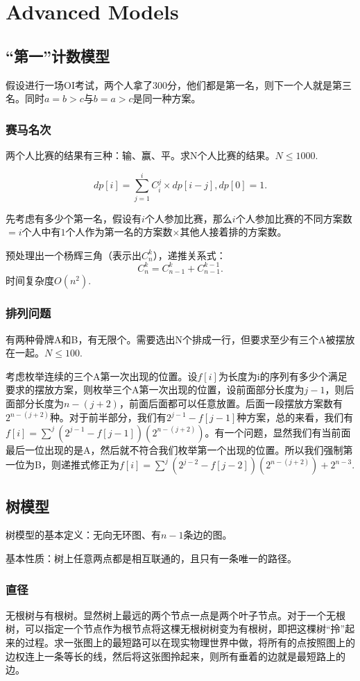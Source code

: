 \section{Advanced Models}
\subsection{“第一”计数模型}
假设进行一场OI考试，两个人拿了300分，他们都是第一名，则下一个人就是第三名。同时$a=b>c$与$b=a>c$是同一种方案。
\subsubsection{赛马名次}
两个人比赛的结果有三种：输、赢、平。求N个人比赛的结果。$N\le 1000.$

\begin{equation*}
    dp[i]=\sum_{j=1}^i C_i^j\times dp[i-j],dp[0]=1.
\end{equation*}

先考虑有多少个第一名，假设有$i$个人参加比赛，那么$i$个人参加比赛的不同方案数$=i$个人中有$1$个人作为第一名的方案数$\times$其他人接着排的方案数。

预处理出一个杨辉三角（表示出$C_n^k$），递推关系式：
\begin{equation*}
    C_n^k=C_{n-1}^k+C_{n-1}^{k-1}.
\end{equation*}
时间复杂度$O(n^2)$.
\subsubsection{排列问题}
有两种骨牌A和B，有无限个。需要选出N个排成一行，但要求至少有三个A被摆放在一起。$N\le 100.$

考虑枚举连续的三个A第一次出现的位置。设$f[i]$为长度为i的序列有多少个满足要求的摆放方案，则枚举三个A第一次出现的位置，设前面部分长度为$j-1$，则后面部分长度为$n-(j+2)$，前面后面都可以任意放置。后面一段摆放方案数有$2^{n-(j+2)}$种。对于前半部分，我们有$2^{j-1}-f[j-1]$种方案，总的来看，我们有$f[i]=\sum^j(2^{j-1}-f[j-1])(2^{n-(j+2)})$。有一个问题，显然我们有当前面最后一位出现的是A，然后就不符合我们枚举第一个出现的位置。所以我们强制第一位为B，则递推式修正为$f[i]=\sum^j(2^{j-2}-f[j-2])(2^{n-(j+2)})+2^{n-3}$.
\subsection{树模型}
树模型的基本定义：无向无环图、有$n-1$条边的图。

基本性质：树上任意两点都是相互联通的，且只有一条唯一的路径。
\subsubsection{直径}
无根树与有根树。显然树上最远的两个节点一点是两个叶子节点。对于一个无根树，可以指定一个节点作为根节点将这棵无根树树变为有根树，即把这棵树“拎”起来的过程。求一张图上的最短路可以在现实物理世界中做，将所有的点按照图上的边权连上一条等长的线，然后将这张图拎起来，则所有垂着的边就是最短路上的边。

